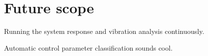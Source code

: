 \section{Future scope}

Running the system response and vibration analysis continuously. 

Automatic control parameter classification sounds cool. 
